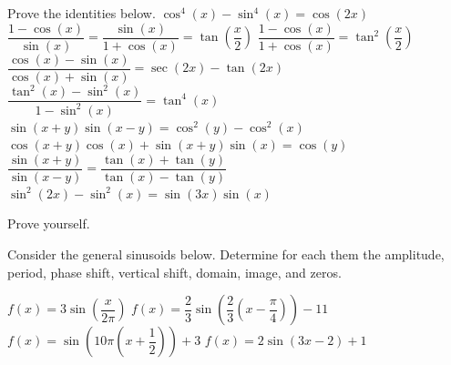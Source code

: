 \begin{Exercise} Prove the identities below.
    \Question[difficulty = 1] $\cos^4 (x) - \sin^4 (x) = \cos (2x)$
    \Question[difficulty = 1] $\dfrac{1-\cos (x)}{\sin(x)} = \dfrac{\sin (x)}{1+\cos (x)} = \tan\left(\dfrac{x}{2}\right)$
    \Question[difficulty = 1] $\dfrac{1-\cos (x)}{1+\cos (x)} = \tan^2\left(\dfrac{x}{2}\right)$
    \Question[difficulty = 2] $\dfrac{\cos (x)-\sin (x)}{\cos (x)+\sin (x)} = \sec (2x)-\tan (2x)$
    \Question[difficulty = 2] $\dfrac{\tan^2 (x) -\sin^2 (x) }{1-\sin^2 (x) }=\tan^4 (x) $
    \Question[difficulty = 1] $\sin( x + y )\sin( x - y )=\cos^2 (y) -\cos^2 (x) $
    \Question[difficulty = 1] $\cos( x + y )\cos (x) +\sin( x + y )\sin (x) =\cos (y) $
    \ifanalysis\Question[difficulty = 1]\fi\ifcalculus\Question[difficulty = 2]\fi $\dfrac{\sin( x + y )}{\sin( x - y )}=\dfrac{\tan (x) +\tan (y) }{\tan (x) -\tan (y) }$
    \ifanalysis\Question[difficulty = 1]\fi\ifcalculus\Question[difficulty = 2]\fi $\sin^2 (2x) -\sin^2 (x) =\sin (3x) \sin (x) $
    \EndCurrentQuestion

\end{Exercise}

\begin{Answer}\phantom{}
    Prove  yourself.
\end{Answer}

\ifcalculus\pagebreak\fi

\begin{Exercise} Consider the general sinusoids below. Determine for each them the amplitude, period, phase shift, vertical shift, domain, image, and zeros.
    \begin{multicols}{2}
    	\Question[difficulty = 1] $f(x)= 3 \sin \left( \dfrac{x}{2 \pi} \right) $
    	\Question[difficulty = 1] $f(x)= \dfrac{2}{3} \sin \left(\dfrac{2}{3} \left( x-\dfrac{\pi}{4}  \right)\right) -11$
    	\Question[difficulty = 1] $f(x)= \sin \left(10 \pi \left( x+\dfrac{1}{2}  \right)\right)+3$
    	\ifanalysis\Question[difficulty = 1]\fi\ifcalculus\Question[difficulty = 2]\fi $f(x)= 2 \sin \left( 3x-2 \right)+1 $
    \EndCurrentQuestion
    \end{multicols}

\end{Exercise}

